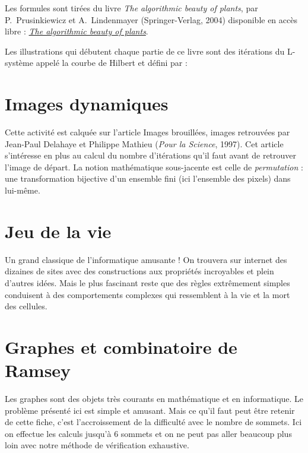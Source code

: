 \documentclass[11pt,class=report,crop=false]{standalone}
\begin{document}
Les formules sont tirées du livre \emph{The algorithmic beauty of plants}, par 
P.~Prusinkiewicz et A.~Lindenmayer (Springer-Verlag, 2004) disponible en accès libre :
\href{http://algorithmicbotany.org/papers/abop/abop.pdf}{\emph{The algorithmic beauty of plants}}.

Les illustrations qui débutent chaque partie de ce livre sont des itérations du L-système appelé la courbe de Hilbert et défini par :

\section{Images dynamiques}


Cette activité est calquée sur l'article \og{}Images brouillées, images retrouvées\fg{}
par Jean-Paul Delahaye et Philippe Mathieu (\emph{Pour la Science}, 1997). Cet article s'intéresse en plus au calcul du nombre d'itérations qu'il faut avant de retrouver l'image de départ. La notion mathématique sous-jacente est celle de \emph{permutation} : une transformation bijective d'un ensemble fini (ici l'ensemble des pixels) dans lui-même.


\section{Jeu de la vie}

Un grand classique de l'informatique amusante ! On trouvera sur internet des dizaines de sites avec des constructions aux propriétés incroyables et plein d'autres idées. Mais le plus fascinant reste que des règles extrêmement simples conduisent à des comportements complexes qui ressemblent à la vie et la mort des cellules.



\section{Graphes et combinatoire de Ramsey}

Les graphes sont des objets très courants en mathématique et en informatique.
Le problème présenté ici est simple et amusant. Mais ce qu'il faut peut être retenir de cette fiche, c'est l'accroissement de la difficulté avec le nombre de sommets. 
Ici on effectue les calculs jusqu'à $6$ sommets et on ne peut pas aller beaucoup plus loin avec notre méthode de vérification exhaustive.
\end{document}
